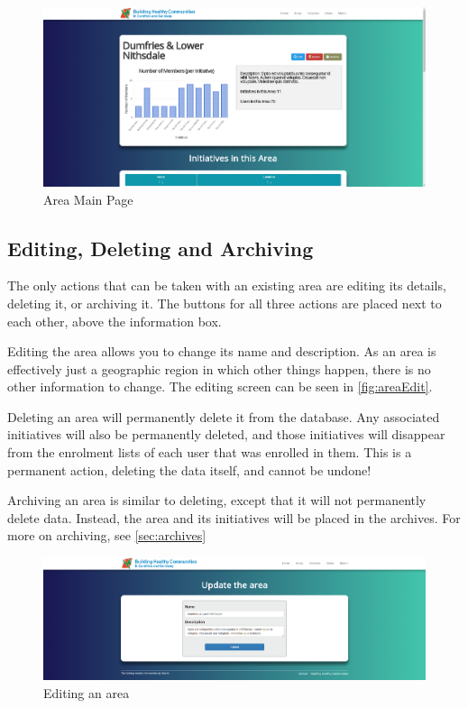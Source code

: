 \documentclass{bhcguides}
\begin{document}
\begin{figure}[h]
 \centerline{\includegraphics[width=\textwidth, height=\textheight, keepaspectratio]{areamainpage.png}}
 \caption{Area Main Page}
 \label{fig:areaMainPage}
\end{figure}

\subsection{Editing, Deleting and Archiving}
\label{ssec:areaeditdelete}

The only actions that can be taken with an existing area are editing its details, deleting it, or archiving it. The buttons for all three actions are placed next to each other, above the information box.

Editing the area allows you to change its name and description. As an area is effectively just a geographic region in which other things happen, there is no other information to change. The editing screen can be seen in \autoref{fig:areaEdit}.

Deleting an area will permanently delete it from the database. Any associated initiatives will also be permanently deleted, and those initiatives will disappear from the enrolment lists of each user that was enrolled in them. This is a permanent action, deleting the data itself, and cannot be undone!

Archiving an area is similar to deleting, except that it will not permanently delete data. Instead, the area and its initiatives will be placed in the archives. For more on archiving, see \autoref{sec:archives}

\begin{figure}[h!]
 \centerline{\includegraphics[width=\textwidth, height=\textheight, keepaspectratio]{areaedit.png}}
 \caption{Editing an area}
 \label{fig:areaEdit}
\end{figure}
\end{document}
